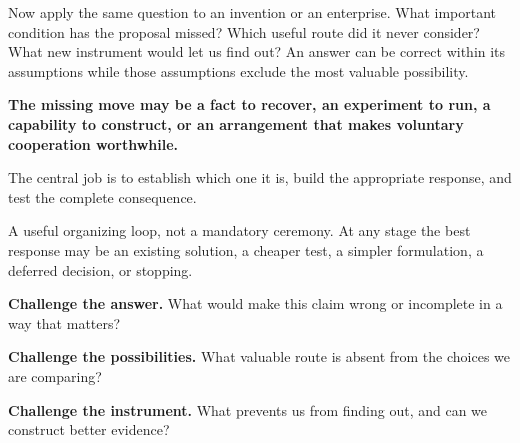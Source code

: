 \documentclass[11pt,letterpaper]{article}
\theoremstyle{remark}\newtheorem{remark}{Remark}[section]
\newcommand{\smallhead}[1]{\par\smallskip{\sffamily\bfseries\color{Gold}#1}\par\smallskip}
\begin{document}
Now apply the same question to an invention or an enterprise. What important condition has the proposal missed? Which useful route did it never consider? What new instrument would let us find out? An answer can be correct within its assumptions while those assumptions exclude the most valuable possibility.
\begin{seabox}
\textbf{The missing move may be a fact to recover, an experiment to run, a capability to construct, or an arrangement that makes voluntary cooperation worthwhile.}\par
The central job is to establish which one it is, build the appropriate response, and test the complete consequence.
\end{seabox}
\begin{center}
\end{center}
{\small\color{Muted}A useful organizing loop, not a mandatory ceremony. At any stage the best response may be an existing solution, a cheaper test, a simpler formulation, a deferred decision, or stopping.}

\smallhead{THREE QUESTIONS THAT REACH BEYOND DEBATE}
\textbf{Challenge the answer.} What would make this claim wrong or incomplete in a way that matters?\par
\textbf{Challenge the possibilities.} What valuable route is absent from the choices we are comparing?\par
\textbf{Challenge the instrument.} What prevents us from finding out, and can we construct better evidence?
\end{document}
